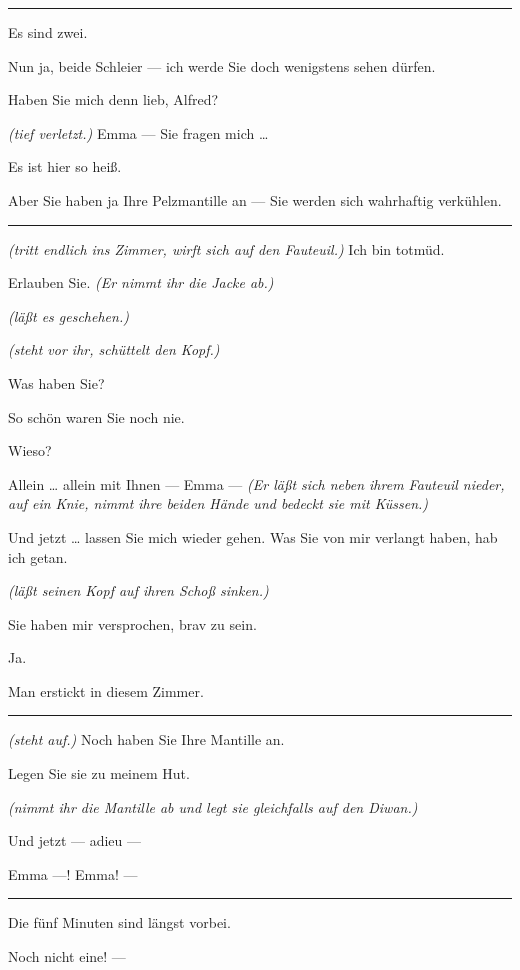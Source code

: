 \documentclass[
	final,
	a4paper,
	ngerman,
	mpinclude = true, %
	twoside = true,
	open = right,
	cleardoublepage = plain,
	DIV = 13,
	BCOR = 1cm,
	titlepage = firstiscover,
	]{scrbook}
\newcommand{\direction}[1]{\textit{(#1)}}
\newenvironment{deletion}{%
		\vspace{0.25\baselineskip}
		\hrule
		\vspace{0.25\baselineskip}
		\color{darkgray}
	}{
		\color{black}
		\vspace{0.25\baselineskip}
		\hrule 
		\vspace{0.25\baselineskip}
	}
\newcommand{\thecharacter}[1]{\textup{\textsc{#1}}\xspace}
\newcommand{\theherr}{\thecharacter{Benjamin}}
\newcommand{\thefrau}{\thecharacter{Emma}}
\newcommand{\character}[1]{\item[#1:]}
\newcommand{\herr}{\character{\theherr}}
\newcommand{\frau}{\character{\thefrau}}
\begin{document}
\begin{play}
\begin{deletion}
	\frau
	Es sind zwei.

	\herr
	Nun ja, beide Schleier --- ich werde Sie doch wenigstens sehen dürfen.

	\frau
	Haben Sie mich denn lieb, Alfred?

	\herr
	\direction{tief verletzt.} Emma --- Sie fragen mich \ldots{}

	\frau
	Es ist hier so heiß.

	\herr
	Aber Sie haben ja Ihre Pelzmantille an --- Sie werden sich wahrhaftig verkühlen.
	\end{deletion}

	\frau
	\direction{tritt endlich ins Zimmer, wirft sich auf den Fauteuil.} Ich bin totmüd.

	\herr
	Erlauben Sie. \direction{Er nimmt ihr die Jacke ab.}

	\frau
	\direction{läßt es geschehen.}

	\herr
	\direction{steht vor ihr, schüttelt den Kopf.}

	\frau
	Was haben Sie?

	\herr
	So schön waren Sie noch nie.

	\frau
	Wieso?

	\herr
	Allein \ldots{} allein mit Ihnen --- Emma --- \direction{Er läßt sich neben ihrem Fauteuil nieder, auf ein Knie, nimmt ihre beiden Hände und bedeckt sie mit Küssen.}

	\frau
	Und jetzt \ldots{} lassen Sie mich wieder gehen. Was Sie von mir verlangt haben, hab ich getan.

	\herr
	\direction{läßt seinen Kopf auf ihren Schoß sinken.}

	\frau
	Sie haben mir versprochen, brav zu sein.

	\herr
	Ja.

	\frau
	Man erstickt in diesem Zimmer.
	\begin{deletion}
	\herr
	\direction{steht auf.} Noch haben Sie Ihre Mantille an.

	\frau
	Legen Sie sie zu meinem Hut.

	\herr
	\direction{nimmt ihr die Mantille ab und legt sie gleichfalls auf den Diwan.}

	\frau
	Und jetzt --- adieu ---

	\herr
	Emma ---! Emma! ---

	\frau
	\end{deletion}
	Die fünf Minuten sind längst vorbei.

	\herr
	Noch nicht eine! ---


\end{play}
\end{document}
